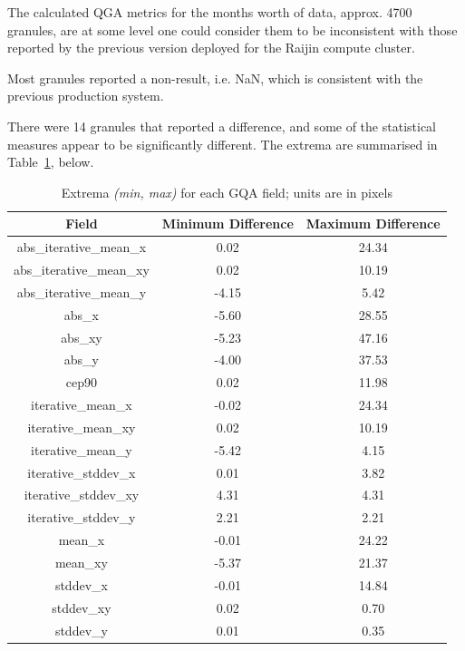 \documentclass[a4paper]{article}
\begin{document}
      \begin{flushleft}
        The calculated QGA metrics for the months worth of data, approx. 4700 granules, are at some level one could consider them to be inconsistent with those reported by the previous version deployed for the Raijin compute cluster. \par
        Most granules reported a non-result, i.e. NaN, which is consistent with the previous production system. \par
        There were 14 granules that reported a difference, and some of the statistical measures appear to be significantly different. The extrema are summarised in Table~\ref{table:13}, below.
      \end{flushleft}

      \begin{table}[ht!]
        \caption{Extrema \textit{(min, max)} for each GQA field; units are in pixels}\label{table:13}
        \centering
        \begin{tabular}{ccc} \midrule
          \textbf{Field} & \textbf{Minimum Difference} & \textbf{Maximum Difference} \\ \midrule
          abs\_iterative\_mean\_x & 0.02 & 24.34 \\
          abs\_iterative\_mean\_xy & 0.02 & 10.19 \\
          abs\_iterative\_mean\_y & -4.15 & 5.42 \\
          abs\_x & -5.60 & 28.55 \\
          abs\_xy & -5.23 & 47.16 \\
          abs\_y & -4.00 & 37.53 \\
          cep90 & 0.02 & 11.98 \\
          iterative\_mean\_x & -0.02 & 24.34 \\
          iterative\_mean\_xy & 0.02 & 10.19 \\
          iterative\_mean\_y & -5.42 & 4.15 \\
          iterative\_stddev\_x & 0.01 & 3.82 \\
          iterative\_stddev\_xy & 4.31 & 4.31 \\
          iterative\_stddev\_y & 2.21 & 2.21 \\
          mean\_x & -0.01 & 24.22 \\
          mean\_xy & -5.37 & 21.37 \\
          stddev\_x & -0.01 & 14.84 \\
          stddev\_xy & 0.02 & 0.70 \\
          stddev\_y & 0.01 & 0.35 \\ \midrule
        \end{tabular}
      \end{table}
\end{document}
